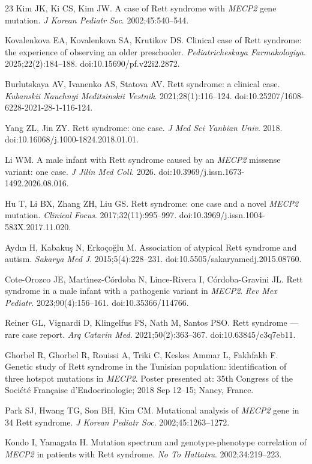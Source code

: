 \documentclass[preprint,12pt]{elsarticle}
\begin{document}
\begin{thebibliography}{23}
Kim JK, Ki CS, Kim JW.
\newblock A case of Rett syndrome with \textit{MECP2} gene mutation.
\newblock \emph{J Korean Pediatr Soc}. 2002;45:540--544.

Kovalenkova EA, Kovalenkova SA, Krutikov DS.
\newblock Clinical case of Rett syndrome: the experience of observing an
older preschooler.
\newblock \emph{Pediatricheskaya Farmakologiya}. 2025;22(2):184--188.
\newblock doi:10.15690/pf.v22i2.2872.

Burlutskaya AV, Ivanenko AS, Statova AV.
\newblock Rett syndrome: a clinical case.
\newblock \emph{Kubanskii Nauchnyi Meditsinskii Vestnik}. 2021;28(1):116--124.
\newblock doi:10.25207/1608-6228-2021-28-1-116-124.

Yang ZL, Jin ZY.
\newblock Rett syndrome: one case.
\newblock \emph{J Med Sci Yanbian Univ}. 2018.
\newblock doi:10.16068/j.1000-1824.2018.01.01.

Li WM.
\newblock A male infant with Rett syndrome caused by an \textit{MECP2}
missense variant: one case.
\newblock \emph{J Jilin Med Coll}. 2026.
\newblock doi:10.3969/j.issn.1673-1492.2026.08.016.

Hu T, Li BX, Zhang ZH, Liu GS.
\newblock Rett syndrome: one case and a novel \textit{MECP2} mutation.
\newblock \emph{Clinical Focus}. 2017;32(11):995--997.
\newblock doi:10.3969/j.issn.1004-583X.2017.11.020.

Ayd{\i}n H, Kabaku\c{s} N, Erko\c{c}o\u{g}lu M.
\newblock Association of atypical Rett syndrome and autism.
\newblock \emph{Sakarya Med J}. 2015;5(4):228--231.
\newblock doi:10.5505/sakaryamedj.2015.08760.

Cote-Orozco JE, Mart{\'\i}nez-C{\'o}rdoba N, Lince-Rivera I,
C{\'o}rdoba-Gravini JL.
\newblock Rett syndrome in a male infant with a pathogenic variant in
\textit{MECP2}.
\newblock \emph{Rev Mex Pediatr}. 2023;90(4):156--161.
\newblock doi:10.35366/114766.

Reiner GL, Vignardi D, Klingelfus FS, Nath M, Santos PSO.
\newblock Rett syndrome --- rare case report.
\newblock \emph{Arq Catarin Med}. 2021;50(2):363--367.
\newblock doi:10.63845/c3q7eb11.

Ghorbel R, Ghorbel R, Rouissi A, Triki C, Keskes Ammar L, Fakhfakh F.
\newblock Genetic study of Rett syndrome in the Tunisian population:
identification of three hotspot mutations in \textit{MECP2}.
\newblock Poster presented at: 35th Congress of the Soci{\'e}t{\'e} Fran{\c{c}}aise
d'Endocrinologie; 2018 Sep 12--15; Nancy, France.

Park SJ, Hwang TG, Son BH, Kim CM.
\newblock Mutational analysis of \textit{MECP2} gene in 34 Rett syndrome.
\newblock \emph{J Korean Pediatr Soc}. 2002;45:1263--1272.

Kondo I, Yamagata H.
\newblock Mutation spectrum and genotype-phenotype correlation of \textit{MECP2}
in patients with Rett syndrome.
\newblock \emph{No To Hattatsu}. 2002;34:219--223.

\end{thebibliography}
\end{document}
